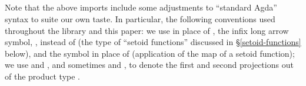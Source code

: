 \begin{code}%
\>[0]\<%
\\
\>[0]%
\>[13]%
\>[52]\AgdaSpace{}%
\<%
\\
\>[0]%
\>[13]%
\>[52]\AgdaSpace{}%
\<%
\\
\>[0]%
\>[13]%
\>[52]\AgdaSpace{}%
\<%
\\
%
\\[\AgdaEmptyExtraSkip]%
\>[0]\AgdaSpace{}%
\<%
\\
\>[0][@{}l@{\AgdaIndent{0}}]%
\>[1]\AgdaSpace{}%
\AgdaSpace{}%
\AgdaSpace{}%
\AgdaSpace{}%
\AgdaSpace{}%
\AgdaSpace{}%
\AgdaSpace{}%
\AgdaSpace{}%
\AgdaSpace{}%
\AgdaSpace{}%
\AgdaSpace{}%
\AgdaSymbol{:}\AgdaSpace{}%
\<%
\\
%
\>[1]\AgdaSpace{}%
\AgdaSpace{}%
\AgdaSymbol{:}\AgdaSpace{}%
\AgdaSpace{}%
\<%
\\
%
\>[1]\AgdaSpace{}%
\AgdaSymbol{:}\AgdaSpace{}%
\AgdaSpace{}%
\<%
\\
\>[0]\<%
\end{code}
\fi
Note that the above imports include some adjustments to ``standard Agda'' syntax to suite our own taste.
In particular, the following conventions used throughout the \agdaalgebras library and this paper: we use  in place of , the infix long arrow symbol,
, instead of  (the type of ``setoid functions'' discussed in §\ref{setoid-functions} below), and the symbol  in place of  (application of the map of a setoid function); we use
 and , and sometimes  and
, to denote the first and second
projections out of the product type
.
\ifshort\else

